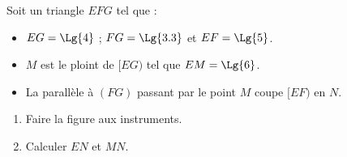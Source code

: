 \begin{exercice*}    
    Soit un triangle $EFG$ tel que :
        \begin{itemize}
            \item $EG=\Lg{4}$ ; $FG=\Lg{3.3}$ et $EF=\Lg{5}$.
            \item $M$ est le ploint de $[EG)$ tel que $EM=\Lg{6}$.
            \item La parallèle à $(FG)$ passant par le point $M$ coupe $[EF)$ en $N$.
        \end{itemize}
        \begin{enumerate}
            \item Faire la figure aux instruments.
            \item Calculer $EN$ et $MN$.
        \end{enumerate}
\end{exercice*}
